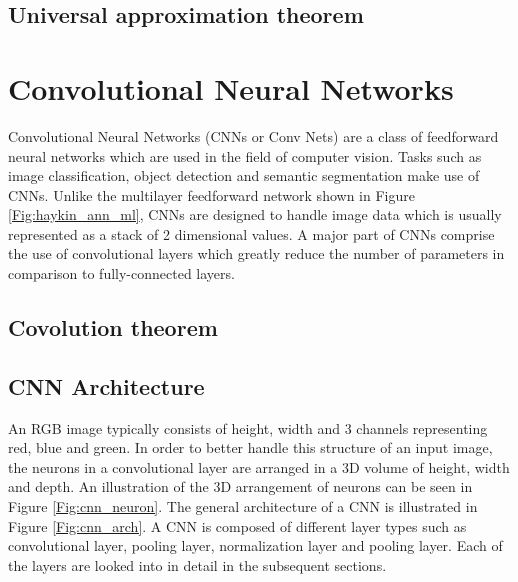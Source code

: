 \subsection{Universal approximation theorem}




\section{Convolutional Neural Networks}

Convolutional Neural Networks (CNNs or Conv Nets) are a class of feedforward neural networks which are used in the field of computer vision. Tasks such as image classification, object detection and semantic segmentation make use of CNNs. Unlike the multilayer feedforward network shown in Figure \ref{Fig:haykin_ann_ml}, CNNs are designed to handle image data which is usually represented as a stack of 2 dimensional values. A major part of CNNs comprise the use of convolutional layers which greatly reduce the number of parameters in comparison to fully-connected layers.

\subsection{Covolution theorem}

\subsection{CNN Architecture}

An RGB image typically consists of height, width and 3 channels representing red, blue and green. In order to better handle this structure of an input image, the neurons in a convolutional layer are arranged in a 3D volume of height, width and depth. An illustration of the 3D arrangement of neurons can be seen in Figure \ref{Fig:cnn_neuron}. The general architecture of a CNN is illustrated in Figure \ref{Fig:cnn_arch}. A CNN is composed of different layer types such as convolutional layer, pooling layer, normalization layer and pooling layer. Each of the layers are looked into in detail in the subsequent sections.

